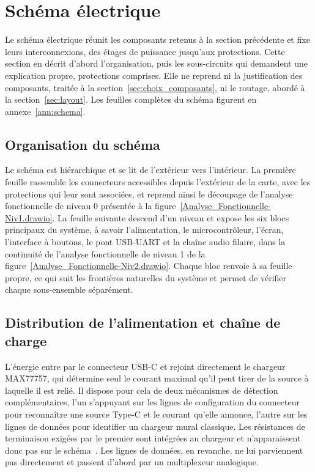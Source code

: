 \section{Schéma électrique}
\label{sec:schema}

Le schéma électrique réunit les composants retenus à la section précédente et fixe leurs interconnexions, des étages de puissance jusqu'aux protections. Cette section en décrit d'abord l'organisation, puis les sous-circuits qui demandent une explication propre, protections comprises. Elle ne reprend ni la justification des composants, traitée à la section~\ref{sec:choix_composants}, ni le routage, abordé à la section~\ref{sec:layout}. Les feuilles complètes du schéma figurent en annexe~\ref{ann:schema}.


\subsection{Organisation du schéma}

Le schéma est hiérarchique et se lit de l'extérieur vers l'intérieur. La première feuille rassemble les connecteurs accessibles depuis l'extérieur de la carte, avec les protections qui leur sont associées, et reprend ainsi le découpage de l'analyse fonctionnelle de niveau 0 présentée à la figure~\ref{Analyse_Fonctionnelle-Niv1.drawio}. La feuille suivante descend d'un niveau et expose les six blocs principaux du système, à savoir l'alimentation, le microcontrôleur, l'écran, l'interface à boutons, le pont USB-UART et la chaîne audio filaire, dans la continuité de l'analyse fonctionnelle de niveau 1 de la figure~\ref{Analyse_Fonctionnelle-Niv2.drawio}. Chaque bloc renvoie à sa feuille propre, ce qui suit les frontières naturelles du système et permet de vérifier chaque sous-ensemble séparément.

\subsection{Distribution de l'alimentation et chaîne de charge}

L'énergie entre par le connecteur USB-C et rejoint directement le chargeur MAX77757, qui détermine seul le courant maximal qu'il peut tirer de la source à laquelle il est relié. Il dispose pour cela de deux mécanismes de détection complémentaires, l'un s'appuyant sur les lignes de configuration du connecteur pour reconnaître une source Type-C et le courant qu'elle annonce, l'autre sur les lignes de données pour identifier un chargeur mural classique. Les résistances de terminaison exigées par le premier sont intégrées au chargeur et n'apparaissent donc pas sur le schéma~\cite{analog_MAX77757}. Les lignes de données, en revanche, ne lui parviennent pas directement et passent d'abord par un multiplexeur analogique.

